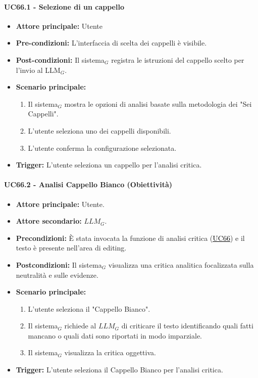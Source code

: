 \documentclass[a4paper, 10pt]{article}
\newcommand{\uclink}[2]{\hyperlink{#1}{\textcolor{black}{\underline{#2}}}}
\begin{document}
\paragraph{UC66.1 - Selezione di un cappello}
\begin{itemize}
    \item \textbf{Attore principale:} Utente
    \item \textbf{Pre-condizioni:} L'interfaccia di scelta dei cappelli è visibile.
    \item \textbf{Post-condizioni:} Il sistema$_G$ registra le istruzioni del cappello scelto per l'invio al LLM$_G$.
    \item \textbf{Scenario principale:}
        \begin{enumerate}
            \item Il sistema$_G$ mostra le opzioni di analisi basate sulla metodologia dei "Sei Cappelli".
            \item L'utente seleziona uno dei cappelli disponibili.
            \item L'utente conferma la configurazione selezionata.
        \end{enumerate}
    \item \textbf{Trigger:} L'utente seleziona un cappello per l'analisi critica.
\end{itemize}

\hypertarget{uc:66.2}{}
\paragraph{UC66.2 - Analisi Cappello Bianco (Obiettività)}
\begin{itemize}
    \item \textbf{Attore principale:} Utente.
    \item \textbf{Attore secondario:} $LLM_G$.
    \item \textbf{Precondizioni:} È stata invocata la funzione di analisi critica (\uclink{uc:66}{UC66}) e il testo è presente nell'area di editing.
    \item \textbf{Postcondizioni:} Il sistema$_G$ visualizza una critica analitica focalizzata sulla neutralità e sulle evidenze.
    \item \textbf{Scenario principale:}
    \begin{enumerate}
        \item L'utente seleziona il "Cappello Bianco".
        \item Il sistema$_G$ richiede al $LLM_G$ di criticare il testo identificando quali fatti mancano o quali dati sono riportati in modo imparziale.
        \item Il sistema$_G$ visualizza la critica oggettiva.
    \end{enumerate}
    \item \textbf{Trigger:} L'utente seleziona il Cappello Bianco per l'analisi critica.
\end{itemize}
\end{document}
